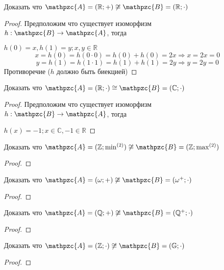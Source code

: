 \documentclass[../main/document.tex]{subfiles}
\begin{document}
\begin{exm}
Доказать что $\mathpzc{A}=(\mathbb{R};+)\not\cong\mathpzc{B}=(\mathbb{R};\cdot)$
\begin{proof}
Предположим что существует изоморфизм $h:\mathpzc{B}\rightarrow \mathpzc{A}$, тогда

$h(0)=x, h(1)=y; x,y\in \mathbb{R}$
$$x=h(0)=h(0\cdot 0)=h(0)+ h(0)=2x\Rightarrow x=2x=0$$
$$y=h(1)=h(1\cdot 1)=h(1)+ h(1)=2y\Rightarrow y=2y=0$$
Противоречие ($h$ должно быть биекцией)
\end{proof}
\end{exm}

\begin{exm}
Доказать что $\mathpzc{A}=(\mathbb{R};\cdot)\cong\mathpzc{B}=(\mathbb{C};\cdot)$
\begin{proof}
Предположим что существует изоморфизм $h:\mathpzc{B}\rightarrow \mathpzc{A}$, тогда

$h(x)=-1; x\in \mathbb{C},-1\in \mathbb{R}$

\end{proof}
\end{exm}

\begin{exm}
Доказать что $\mathpzc{A}=(\mathbb{Z};{\operatorname{min}}^{(2)})\not\cong\mathpzc{B}=(\mathbb{Z};{\operatorname{max}}^{(2)})$
\begin{proof}

\end{proof}
\end{exm}

\begin{exm}
Доказать что $\mathpzc{A}=(\omega;+)\not\cong\mathpzc{B}=(\omega^+;\cdot)$
\begin{proof}

\end{proof}
\end{exm}

\begin{exm}
Доказать что $\mathpzc{A}=(\mathbb{Q};+)\not\cong\mathpzc{B}=(\mathbb{Q}^+;\cdot)$
\begin{proof}

\end{proof}
\end{exm}

\begin{exm}
Доказать что $\mathpzc{A}=(\mathbb{Z};\cdot)\not\cong\mathpzc{B}=(\mathbb{G};\cdot)$
\begin{proof}

\end{proof}
\end{exm}
\end{document}
